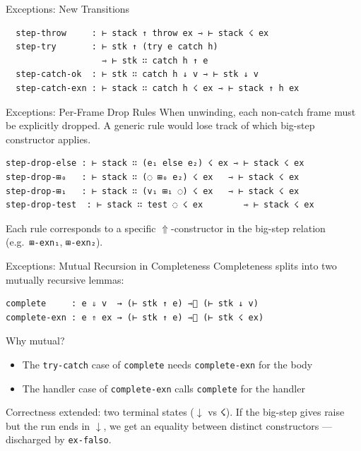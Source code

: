 \documentclass[10pt,compress,aspectratio=169]{beamer}
\begin{document}
\begin{frame}[fragile]{Exceptions: New Transitions}
\begin{verbatim}
  step-throw     : ⊢ stack ↑ throw ex ⇾ ⊢ stack ☇ ex
  step-try       : ⊢ stk ↑ (try e catch h)
                   ⇾ ⊢ stk ∷ catch h ↑ e
  step-catch-ok  : ⊢ stk ∷ catch h ↓ v ⇾ ⊢ stk ↓ v
  step-catch-exn : ⊢ stack ∷ catch h ☇ ex ⇾ ⊢ stack ↑ h ex
\end{verbatim}
\end{frame}

\begin{frame}[fragile]{Exceptions: Per-Frame Drop Rules}
  When unwinding, each non-catch frame must be explicitly dropped.
  A generic rule would lose track of which big-step constructor applies.

\begin{verbatim}
step-drop-𝚎𝚕𝚜𝚎 : ⊢ stack ∷ (e₁ 𝚎𝚕𝚜𝚎 e₂) ☇ ex ⇾ ⊢ stack ☇ ex
step-drop-⊞₀   : ⊢ stack ∷ (◌ ⊞₀ e₂) ☇ ex   ⇾ ⊢ stack ☇ ex
step-drop-⊞₁   : ⊢ stack ∷ (v₁ ⊞₁ ◌) ☇ ex   ⇾ ⊢ stack ☇ ex
step-drop-test  : ⊢ stack ∷ test ◌ ☇ ex        ⇾ ⊢ stack ☇ ex
\end{verbatim}

  Each rule corresponds to a specific $\Uparrow$-constructor in the big-step relation (e.g.\ \texttt{⊞-exn₁}, \texttt{⊞-exn₂}).
\end{frame}

\begin{frame}[fragile]{Exceptions: Mutual Recursion in Completeness}
  Completeness splits into two mutually recursive lemmas:

\begin{verbatim}
complete     : e ⇓ v  → (⊢ stk ↑ e) ⇾⃰ (⊢ stk ↓ v)
complete-exn : e ⇑ ex → (⊢ stk ↑ e) ⇾⃰ (⊢ stk ☇ ex)
\end{verbatim}

  \bigskip
  Why mutual?
  \begin{itemize}
    \item The \texttt{try-catch} case of \texttt{complete} needs \texttt{complete-exn} for the body
    \item The handler case of \texttt{complete-exn} calls \texttt{complete} for the handler
  \end{itemize}

  \bigskip
  Correctness extended: two terminal states ($\downarrow$ vs $\text{☇}$).
  If the big-step gives raise but the run ends in $\downarrow$, we get an equality between distinct constructors — discharged by \texttt{ex-falso}.
\end{frame}
\end{document}
